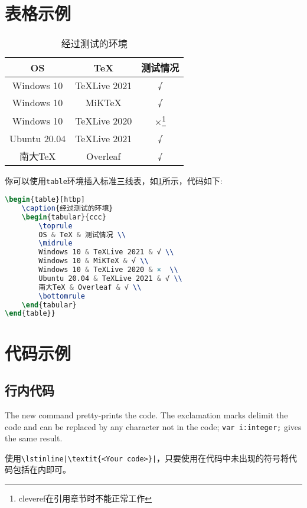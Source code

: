 \section{表格示例}
\begin{table}[htbp]
    \caption{经过测试的环境}
    \label{tab:testtab}
    \begin{tabular}{ccc}
        \toprule
        OS & TeX & 测试情况 \\
        \midrule
        Windows 10 & TeXLive 2021 & √ \\
        Windows 10 & MiKTeX & √ \\
        Windows 10 & TeXLive 2020 & ×\footnote{cleveref在引用章节时不能正常工作}  \\
        Ubuntu 20.04 & TeXLive 2021 & √ \\
        南大TeX & Overleaf & √ \\
        \bottomrule
    \end{tabular}
\end{table}
你可以使用\lstinline|table|环境插入标准三线表，如\cref{tab:testtab}所示，代码如下:
\begin{lstlisting}[language=TeX]
\begin{table}[htbp]
    \caption{经过测试的环境}
    \begin{tabular}{ccc}
        \toprule
        OS & TeX & 测试情况 \\
        \midrule
        Windows 10 & TeXLive 2021 & √ \\
        Windows 10 & MiKTeX & √ \\
        Windows 10 & TeXLive 2020 & ×  \\
        Ubuntu 20.04 & TeXLive 2021 & √ \\
        南大TeX & Overleaf & √ \\
        \bottomrule
    \end{tabular}
\end{table}}
\end{lstlisting}



\section{代码示例}


\subsection{行内代码}
The new command pretty-prints the code. The exclamation marks delimit
the code and can be replaced by any character not in the code;
\lstinline$var i:integer;$ gives the same result.

使用\lstinline!\lstinline|\textit{<Your code>}|!，只要使用在代码中未出现的符号将代码包括在内即可。
